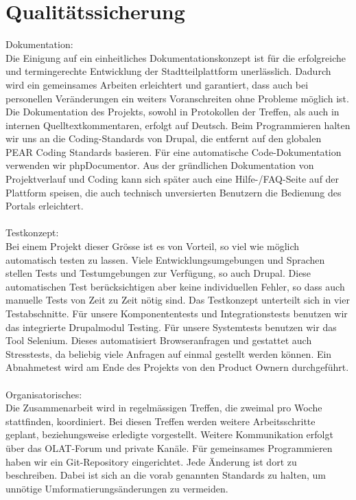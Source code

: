 \documentclass{swp}
\begin{document}
\section{Qualit\"atssicherung}
Dokumentation: \\Die Einigung auf ein einheitliches Dokumentationskonzept ist f\"ur die erfolgreiche und termingerechte Entwicklung der Stadtteilplattform unerl\"asslich. Dadurch wird ein gemeinsames Arbeiten erleichtert und garantiert, dass auch bei personellen Ver\"anderungen ein weiters Voranschreiten ohne Probleme m\"oglich ist. Die Dokumentation des Projekts, sowohl in Protokollen der Treffen, als auch in internen Quelltextkommentaren, erfolgt auf Deutsch. Beim Programmieren halten wir uns an die Coding-Standards von Drupal, die entfernt auf den globalen \glqq PEAR Coding Standards\grqq{} basieren. F\"ur eine automatische Code-Dokumentation verwenden wir phpDocumentor. Aus der gr\"undlichen Dokumentation von Projektverlauf und Coding kann sich sp\"ater auch eine Hilfe-/FAQ-Seite auf der Plattform speisen, die auch technisch unversierten Benutzern die Bedienung des Portals erleichtert.\\\\
Testkonzept:\\Bei einem Projekt dieser Gr\"o{ss}e ist es von Vorteil, so viel wie m\"oglich automatisch testen zu lassen. Viele Entwicklungsumgebungen und Sprachen stellen Tests und Testumgebungen zur Verf\"ugung, so auch Drupal. Diese automatischen Test ber\"ucksichtigen aber keine individuellen Fehler, so dass auch manuelle Tests von Zeit zu Zeit n\"otig sind. Das Testkonzept unterteilt sich in vier Testabschnitte. F\"ur unsere Komponententests und Integrationstests benutzen wir das integrierte Drupalmodul \glqq Testing\grqq{}. F\"ur unsere Systemtests benutzen wir das Tool \glqq Selenium\grqq{}. Dieses automatisiert Browseranfragen und gestattet auch Stresstests, da beliebig viele Anfragen auf einmal gestellt werden k\"onnen. Ein Abnahmetest wird am Ende des Projekts von den Product Ownern durchgef\"uhrt.\\\\
Organisatorisches:\\Die Zusammenarbeit wird in regelm\"a{ss}igen Treffen, die zweimal pro Woche stattfinden, koordiniert. Bei diesen Treffen werden weitere Arbeitsschritte geplant, beziehungsweise erledigte vorgestellt. Weitere Kommunikation erfolgt \"uber das OLAT-Forum und private Kan\"ale. F\"ur gemeinsames Programmieren haben wir ein Git-Repository eingerichtet. Jede \"Anderung ist dort zu beschreiben. Dabei ist sich an die vorab genannten Standards zu halten, um unn\"otige Umformatierungs\"anderungen zu vermeiden.
\end{document}
